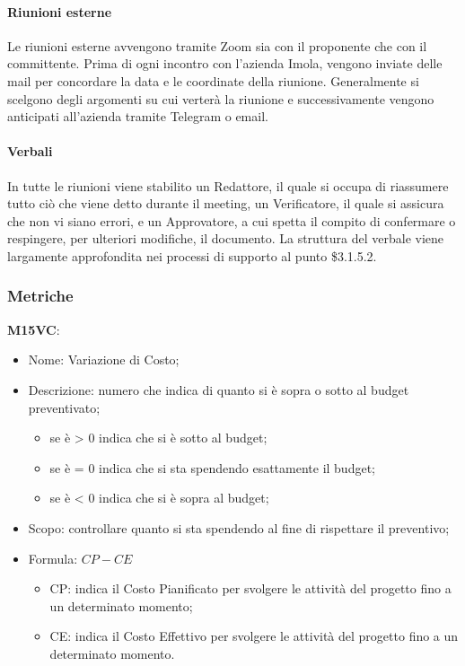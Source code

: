 \paragraph{Riunioni esterne} \hfill \break
Le riunioni esterne avvengono tramite Zoom sia con il proponente che con il committente. Prima di ogni incontro con 
l'azienda Imola, vengono inviate delle mail per concordare la data e le coordinate della riunione. Generalmente si scelgono
degli argomenti su cui verterà la riunione e successivamente vengono anticipati all'azienda tramite Telegram o email.

\paragraph{Verbali} \hfill \break
In tutte le riunioni viene stabilito un Redattore, il quale si occupa di riassumere tutto ciò che
viene detto durante il meeting, un Verificatore, il quale si assicura che non vi siano errori, e un Approvatore,
a cui spetta il compito di confermare o respingere, per ulteriori modifiche, il documento. La struttura del verbale viene 
largamente approfondita nei processi di supporto al punto \$3.1.5.2.

\subsubsection{Metriche}
\textbf{M15VC}:
\begin{itemize}
    \item Nome: Variazione di Costo;
    \item Descrizione: numero che indica di quanto si è sopra o sotto al budget preventivato;
         \begin{itemize}
            \item se è > 0 indica che si è sotto al budget;
            \item se è = 0 indica che si sta spendendo esattamente il budget;
            \item se è < 0 indica che si è sopra al budget;
        \end{itemize}
    \item Scopo: controllare quanto si sta spendendo al fine di rispettare il preventivo;
    \item Formula: $ CP - CE $
        \begin{itemize}
            \item CP: indica il Costo Pianificato per svolgere le attività del progetto fino a un determinato momento;
            \item CE: indica il Costo Effettivo per svolgere le attività del progetto fino a un determinato momento.
        \end{itemize}
\end{itemize}

